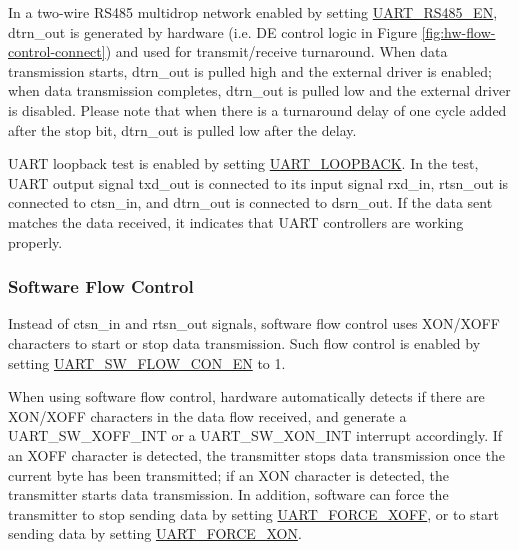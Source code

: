 \documentclass[main\_\_EN.tex]{subfiles}
\begin{document}
In a two-wire RS485 multidrop network enabled by setting \hyperref[fielddesc:UARTRS485EN]{UART\_RS485\_EN}, dtrn\_out is generated by hardware (i.e. DE control logic in Figure \ref{fig:hw-flow-control-connect}) and used for transmit/receive turnaround. When data transmission starts, dtrn\_out is pulled high and the external driver is enabled; when data transmission completes, dtrn\_out is pulled low and the external driver is disabled. Please note that when there is a turnaround delay of one cycle added after the stop bit, dtrn\_out is pulled low after the delay.

UART loopback test is enabled by setting \hyperref[fielddesc:UARTLOOPBACK]{UART\_LOOPBACK}. In the test, UART output signal txd\_out is connected to its input signal rxd\_in, rtsn\_out is connected to ctsn\_in, and dtrn\_out is connected to dsrn\_out. If the data sent matches the data received, it indicates that UART controllers are working properly.

\subsubsection{Software Flow Control}

Instead of ctsn\_in and rtsn\_out signals, software flow control uses XON/XOFF characters to start or stop data transmission. Such flow control is enabled by setting \hyperref[fielddesc:UARTSWFLOWCONEN]{UART\_SW\_FLOW\_CON\_EN} to 1.

When using software flow control, hardware automatically detects if there are XON/XOFF characters in the data flow received, and generate a UART\_SW\_XOFF\_INT or a UART\_SW\_XON\_INT interrupt accordingly. If an XOFF character is detected, the transmitter stops data transmission once the current byte has been transmitted; if an XON character is detected, the transmitter starts data transmission. In addition, software can force the transmitter to stop sending data by setting \hyperref[fielddesc:UARTFORCEXOFF]{UART\_FORCE\_XOFF}, or to start sending data by setting \hyperref[fielddesc:UARTFORCEXON]{UART\_FORCE\_XON}.
\end{document}
